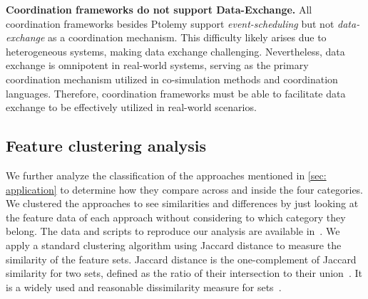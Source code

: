 \documentclass[runningheads]{llncs}
\begin{document}
\textbf{Coordination frameworks do not support Data-Exchange.}
All coordination frameworks besides Ptolemy support \textit{event-scheduling} but not \textit{data-exchange} as a coordination mechanism.
This difficulty likely arises due to heterogeneous systems, making data exchange challenging.
Nevertheless, data exchange is omnipotent in real-world systems, serving as the primary coordination mechanism utilized in co-simulation methods and coordination languages.
Therefore, coordination frameworks must be able to facilitate data exchange to be effectively utilized in real-world scenarios.

\subsection{Feature clustering analysis}

We further analyze the classification of the approaches mentioned in \autoref{sec: application} to determine how they compare across and inside the four categories.
We clustered the approaches to see similarities and differences by just looking at the feature data of each approach without considering to which category they belong.
The data and scripts to reproduce our analysis are available in~\cite{timkrauterArtifactsCoordination2024}.
We apply a standard clustering algorithm using Jaccard distance to measure the similarity of the feature sets.
Jaccard distance is the one-complement of Jaccard similarity for two sets, defined as the ratio of their intersection to their union~\cite{levandowskyDistanceSets1971}.
It is a widely used and reasonable dissimilarity measure for sets~\cite{levandowskyDistanceSets1971}.
\end{document}
